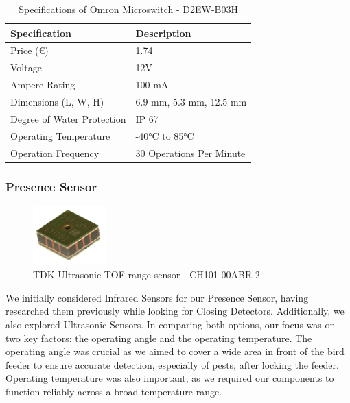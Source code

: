 \documentclass[12pt,a4paper]{article}
\begin{document}
\begin{table}[h]
    \centering
    \begin{tabular}{|l|l|}
    \hline
    \textbf{Specification} & \textbf{Description} \\ \hline
    Price (€)              & 1.74                 \\ \hline
    Voltage                & 12V                  \\ \hline
    Ampere Rating          & 100 mA               \\ \hline
    Dimensions (L, W, H)   & 6.9 mm, 5.3 mm, 12.5 mm \\ \hline
    Degree of Water Protection & IP 67           \\ \hline
    Operating Temperature  & -40°C to 85°C        \\ \hline
    Operation Frequency    & 30 Operations Per Minute \\ \hline
    \end{tabular}
    \caption{Specifications of Omron Microswitch - D2EW-B03H}
    \label{tab:omron_microswitch Specification}
    \end{table}

\subsubsection{Presence Sensor}
\begin{figure}[h]
    \centering
    \includegraphics[width=0.25\textwidth]{images/TOF_CH101_b.png}
    \caption{TDK Ultrasonic TOF range sensor - CH101-00ABR 2 \cite{presence_sensor}}
\end{figure}
We initially considered Infrared Sensors for our Presence Sensor, having researched them previously while looking for Closing Detectors. Additionally, we also explored Ultrasonic Sensors. In comparing both options, our focus was on two key factors: the operating angle and the operating temperature. The operating angle was crucial as we aimed to cover a wide area in front of the bird feeder to ensure accurate detection, especially of pests, after locking the feeder. Operating temperature was also important, as we required our components to function reliably across a broad temperature range. 
\end{document}
